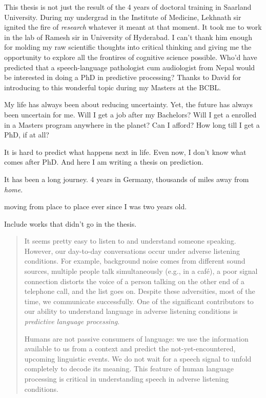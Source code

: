 \documentclass[a4paper, nobind]{templates/ociamthesis}
\begin{document}
\begin{romanpages}
\begin{preface}
 This thesis is not just the result of the 4 years of doctoral training in Saarland University.
 During my undergrad in the Institute of Medicine, Lekhnath sir ignited the fire of \emph{research} whatever it meant at that moment.
 It took me to work in the lab of Ramesh sir in University of Hyderabad.
 I can't thank him enough for molding my raw scientific thoughts into critical thinking and giving me the opportunity to explore all the frontires of cognitive science possible.
 Who'd have predicted that a speech-language pathologist cum audiologist from Nepal would be interested in doing a PhD in predictive processing?
 Thanks to David for introducing to this wonderful topic during my Masters at the BCBL.

 My life has always been about reducing uncertainty.
 Yet, the future has always been uncertain for me.
 Will I get a job after my Bachelors?
 Will I get a enrolled in a Masters program anywhere in the planet?
 Can I afford?
 How long till I get a PhD, if at all?

 It is hard to predict what happens next in life.
 Even now, I don't know what comes after PhD.
 And here I am writing a thesis on prediction.

 It has been a long journey.
 4 years in Germany, thousands of miles away from \emph{home}.

 moving from place to place ever since I was two years old.

 Include works that didn't go in the thesis.
\end{preface}





\renewcommand{\abstracttitle}{Abstract}
\begin{abstract}
	It seems pretty easy to listen to and understand someone speaking.
However, our day-to-day conversations occur under adverse listening conditions.
For example, background noise comes from different sound sources, multiple people talk simultaneously (e.g., in a café), a poor signal connection distorts the voice of a person talking on the other end of a telephone call, and the list goes on.
Despite these adversities, most of the time, we communicate successfully.
One of the significant contributors to our ability to understand language in adverse listening conditions is \emph{predictive language processing}.

Humans are not passive consumers of language:
we use the information available to us from a context and predict the not-yet-encountered, upcoming linguistic events.
We do not wait for a speech signal to unfold completely to decode its meaning.
This feature of human language processing is critical in understanding speech in adverse listening conditions.


\end{abstract}
\end{romanpages}
\end{document}
